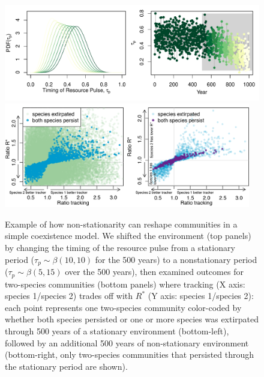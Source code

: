 \documentclass[11pt,letterpaper]{article}
\begin{document}
\begin{figure}[h!]
\centering
\includegraphics[width=1\textwidth]{..//..//..//..//R/graphs/modelruns/manuscript/modelsuppAlt.pdf}
\includegraphics[width=0.96\textwidth]{..//..//..//..//R/graphs/modelruns/manuscript/alpharstar_2panelwide_adj.png}
\caption{Example of how non-stationarity can reshape communities in a simple coexistence model. We shifted the environment (top panels) by changing the timing of the resource pulse from a stationary period ($\tau_{p} \sim \beta(10,10)$ for the 500 years) to a nonstationary period ($\tau_{p}\sim \beta(5,15)$ over the 500 years), then examined outcomes for two-species communities (bottom panels) where tracking (X axis: species 1/species 2) trades off with $R^*$ (Y axis: species 1/species 2): each point represents one two-species community color-coded by whether both species persisted or one or more species was extirpated through 500 years of a stationary environment (bottom-left), followed by an additional 500 years of non-stationary environment (bottom-right, only two-species communities that persisted through the stationary period are shown).}
\label{fig:modelfig} 
\end{figure}
\end{document}
